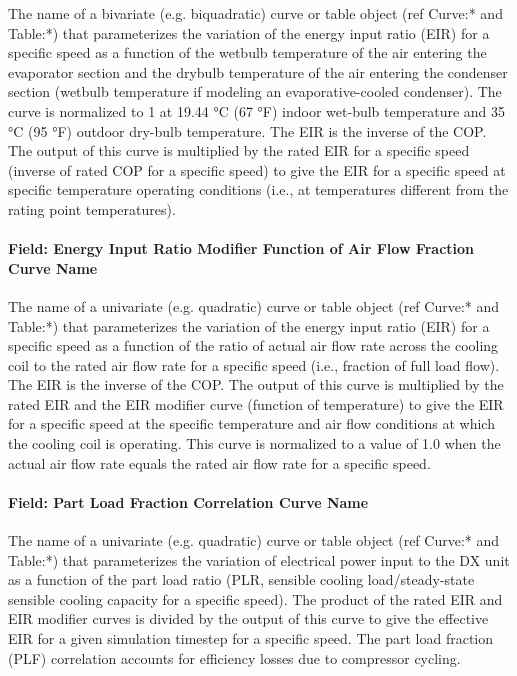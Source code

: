 The name of a bivariate (e.g. biquadratic) curve or table object (ref Curve:* and Table:*) that parameterizes the variation of the energy input ratio (EIR) for a specific speed as a function of the wetbulb temperature of the air entering the evaporator section and the drybulb temperature of the air entering the condenser section (wetbulb temperature if modeling an evaporative-cooled condenser). The curve is normalized to 1 at 19.44 °C (67 °F) indoor wet-bulb temperature and 35 °C (95 °F) outdoor dry-bulb temperature. The EIR is the inverse of the COP. The output of this curve is multiplied by the rated EIR for a specific speed (inverse of rated COP for a specific speed) to give the EIR for a specific speed at specific temperature operating conditions (i.e., at temperatures different from the rating point temperatures).

\paragraph{Field: Energy Input Ratio Modifier Function of Air Flow Fraction Curve Name}\label{field-energy-input-ratio-function-of-air-flow-fraction-curve-name}

The name of a univariate (e.g. quadratic) curve or table object (ref Curve:* and Table:*) that parameterizes the variation of the energy input ratio (EIR) for a specific speed as a function of the ratio of actual air flow rate across the cooling coil to the rated air flow rate for a specific speed (i.e., fraction of full load flow). The EIR is the inverse of the COP. The output of this curve is multiplied by the rated EIR and the EIR modifier curve (function of temperature) to give the EIR for a specific speed at the specific temperature and air flow conditions at which the cooling coil is operating. This curve is normalized to a value of 1.0 when the actual air flow rate equals the rated air flow rate for a specific speed.

\paragraph{Field: Part Load Fraction Correlation Curve Name}

The name of a univariate (e.g. quadratic) curve or table object (ref Curve:* and Table:*) that parameterizes the variation of electrical power input to the DX unit as a function of the part load ratio (PLR, sensible cooling load/steady-state sensible cooling capacity for a specific speed). The product of the rated EIR and EIR modifier curves is divided by the output of this curve to give the effective EIR for a given simulation timestep for a specific speed. The part load fraction (PLF) correlation accounts for efficiency losses due to compressor cycling.

